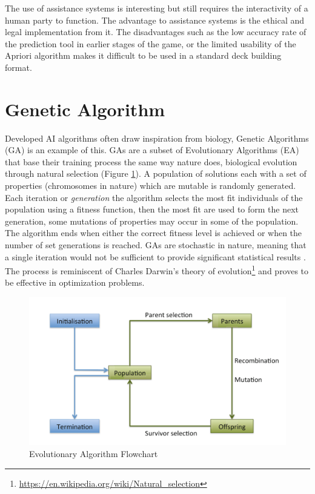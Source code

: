 \documentclass{report}
\begin{document}
The use of assistance systems is interesting but still requires the interactivity of a human party to function. The advantage to assistance systems is the ethical and legal implementation from it. The disadvantages such as the low accuracy rate of the prediction tool in earlier stages of the game, or the limited usability of the Apriori algorithm makes it difficult to be used in a standard deck building format.

\section{Genetic Algorithm}
Developed AI algorithms often draw inspiration from biology\cite{Eiben2015}, Genetic Algorithms (GA) is an example of this. GAs are a subset of Evolutionary Algorithms (EA) that base their training process the same way nature does, biological evolution through natural selection (Figure \ref{ea}).  A population of solutions each with a set of properties (chromosomes in nature) which are mutable is randomly generated. Each iteration or \textit{generation} the algorithm selects the most fit individuals of the population using a fitness function, then the most fit are used to form the next generation, some mutations of properties may occur in some of the population. The algorithm ends when either the correct fitness level is achieved  or when the number of set generations is reached\cite{Whitley1994}. GAs are stochastic in nature, meaning that a single iteration would not be sufficient to provide significant statistical results \cite{Merelo2015}. The process is reminiscent of Charles Darwin's theory of evolution\footnote{\url{https://en.wikipedia.org/wiki/Natural_selection}} and proves to be effective in optimization problems\cite{Eiben2015}.  \begin{figure}[h]
\centering
\includegraphics[width=1\textwidth]{EAFlowchart}
\caption{Evolutionary Algorithm Flowchart \cite{Eiben2015}  }
\label{ea}
\end{figure}
\end{document}
